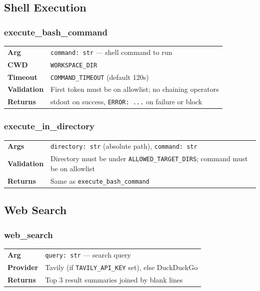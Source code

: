 \documentclass[11pt,a4paper]{article}
\begin{document}
\subsection{Shell Execution}

\subsubsection{execute\_bash\_command}

\begin{tabular}{@{}lp{10cm}@{}}
\textbf{Arg} & \texttt{command: str} --- shell command to run \\
\textbf{CWD} & \texttt{WORKSPACE\_DIR} \\
\textbf{Timeout} & \texttt{COMMAND\_TIMEOUT} (default 120s) \\
\textbf{Validation} & First token must be on allowlist; no chaining operators \\
\textbf{Returns} & stdout on success, \texttt{ERROR: ...} on failure or block \\
\end{tabular}

\subsubsection{execute\_in\_directory}

\begin{tabular}{@{}lp{10cm}@{}}
\textbf{Args} & \texttt{directory: str} (absolute path), \texttt{command: str} \\
\textbf{Validation} & Directory must be under \texttt{ALLOWED\_TARGET\_DIRS}; command must be on allowlist \\
\textbf{Returns} & Same as \texttt{execute\_bash\_command} \\
\end{tabular}

\subsection{Web Search}

\subsubsection{web\_search}

\begin{tabular}{@{}lp{10cm}@{}}
\textbf{Arg} & \texttt{query: str} --- search query \\
\textbf{Provider} & Tavily (if \texttt{TAVILY\_API\_KEY} set), else DuckDuckGo \\
\textbf{Returns} & Top 3 result summaries joined by blank lines \\
\end{tabular}
\end{document}
